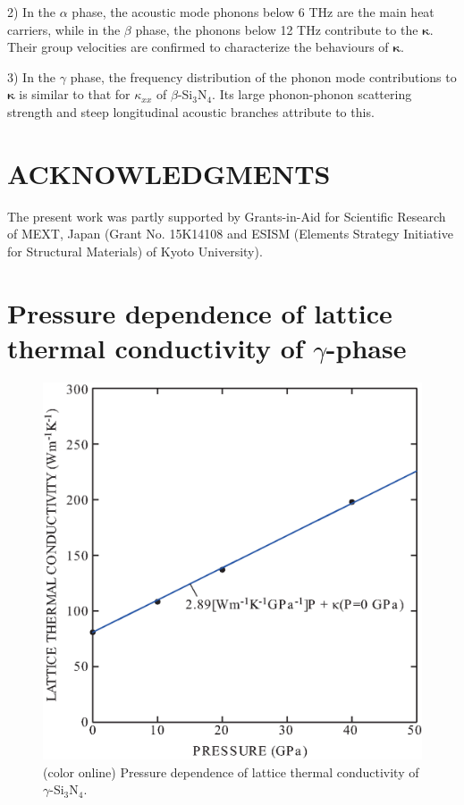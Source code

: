 \documentclass[twocolumn,amsmath,amssymb,a4paper,prb,superscriptaddress,floatfix]{revtex4-1}
\begin{document}
2) In the $\alpha$ phase, the acoustic mode phonons below 6 THz are the main
heat carriers, while in the $\beta$ phase, the phonons below 12 THz contribute
to the $\boldsymbol{\kappa}$. Their group velocities are confirmed to characterize the
behaviours of $\boldsymbol{\kappa}$.

3) In the $\gamma$ phase, the frequency distribution of the phonon mode
contributions to $\boldsymbol{\kappa}$ is similar to that for $\kappa_{xx}$ of
$\beta$-Si$_3$N$_4$. Its large phonon-phonon scattering strength and steep
longitudinal acoustic branches attribute to this.



\section*{ACKNOWLEDGMENTS}
The present work was partly supported by Grants-in-Aid for Scientific
Research of MEXT, Japan (Grant No. 15K14108 and ESISM (Elements Strategy
Initiative for Structural Materials) of Kyoto University).

\appendix
\section{Pressure dependence of lattice thermal conductivity of $\gamma$-phase}
\begin{figure}[ht]
 \begin{center}
  \includegraphics[width=0.80\linewidth]{S1.eps} \caption{(color online)
  Pressure dependence of lattice thermal conductivity of $\gamma$-Si$_3$N$_4$.  \label{fig:S1} }
 \end{center}
\end{figure}

\end{document}
